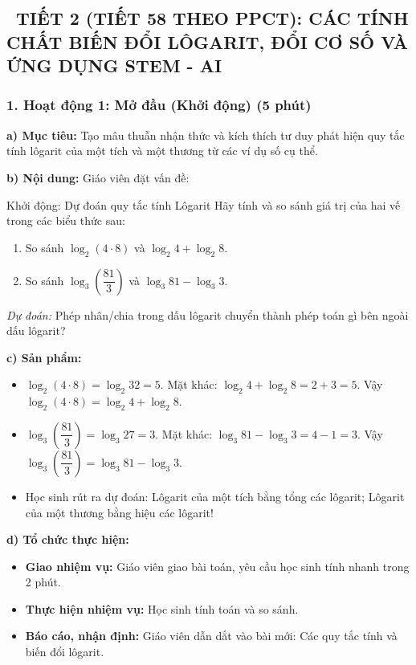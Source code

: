 \documentclass[12pt, a4paper]{article}
\begin{document}
\vspace{10pt}

\subsection*{\faClockO \ TIẾT 2 (TIẾT 58 THEO PPCT): CÁC TÍNH CHẤT BIẾN ĐỔI LÔGARIT, ĐỔI CƠ SỐ VÀ ỨNG DỤNG STEM - AI}

\subsubsection*{1. Hoạt động 1: Mở đầu (Khởi động) (5 phút)}

\noindent \textbf{a) Mục tiêu:}
Tạo mâu thuẫn nhận thức và kích thích tư duy phát hiện quy tắc tính lôgarit của một tích và một thương từ các ví dụ số cụ thể.

\noindent \textbf{b) Nội dung:}
Giáo viên đặt vấn đề:
\begin{pedabox}{Khởi động: Dự đoán quy tắc tính Lôgarit}
Hãy tính và so sánh giá trị của hai vế trong các biểu thức sau:
\begin{enumerate}[leftmargin=0.6cm]
    \item So sánh $\log_2 (4 \cdot 8)$ và $\log_2 4 + \log_2 8$.
    \item So sánh $\log_3 \left(\dfrac{81}{3}\right)$ và $\log_3 81 - \log_3 3$.
\end{enumerate}
\textit{Dự đoán:} Phép nhân/chia trong dấu lôgarit chuyển thành phép toán gì bên ngoài dấu lôgarit?
\end{pedabox}

\noindent \textbf{c) Sản phẩm:}
\begin{itemize}
    \item $\log_2 (4 \cdot 8) = \log_2 32 = 5$. Mặt khác: $\log_2 4 + \log_2 8 = 2 + 3 = 5$. Vậy $\log_2 (4 \cdot 8) = \log_2 4 + \log_2 8$.
    \item $\log_3 \left(\dfrac{81}{3}\right) = \log_3 27 = 3$. Mặt khác: $\log_3 81 - \log_3 3 = 4 - 1 = 3$. Vậy $\log_3 \left(\dfrac{81}{3}\right) = \log_3 81 - \log_3 3$.
    \item Học sinh rút ra dự đoán: Lôgarit của một tích bằng tổng các lôgarit; Lôgarit của một thương bằng hiệu các lôgarit!
\end{itemize}

\noindent \textbf{d) Tổ chức thực hiện:}
\begin{itemize}[leftmargin=0.6cm]
    \item \textbf{Giao nhiệm vụ:} Giáo viên giao bài toán, yêu cầu học sinh tính nhanh trong 2 phút.
    \item \textbf{Thực hiện nhiệm vụ:} Học sinh tính toán và so sánh.
    \item \textbf{Báo cáo, nhận định:} Giáo viên dẫn dắt vào bài mới: Các quy tắc tính và biến đổi lôgarit.
\end{itemize}
\end{document}
